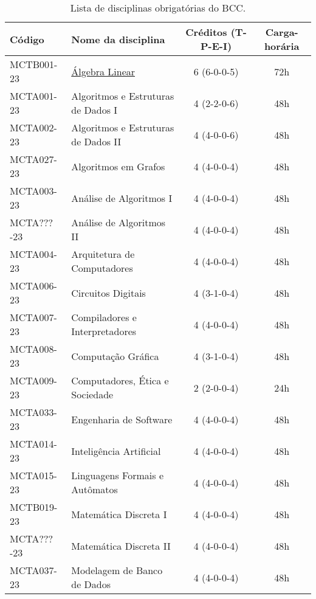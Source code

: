 \begin{table}[!h]
    \caption{Lista de disciplinas obrigatórias do BCC.}
    \label{tab:disciplinas_obrigatorias_bcc}

    \centering
    \begin{tabular}{|l|p{}|c|c|}
        \hline
        \textbf{Código} & \textbf{Nome da disciplina} & \textbf{Créditos (T-P-E-I)} & \textbf{Carga-horária}\\
        \hline\hline
        MCTB001-23 & \hyperref[disc:alge_lin]{Álgebra Linear} & 6 (6-0-0-5) & 72h \\
        \hline
        MCTA001-23 & Algoritmos e Estruturas de Dados I & 4 (2-2-0-6) & 48h \\
        \hline
        MCTA002-23 & Algoritmos e Estruturas de Dados II & 4 (4-0-0-6) & 48h \\
        \hline
        MCTA027-23 & Algoritmos em Grafos & 4 (4-0-0-4) & 48h\\
        \hline
        MCTA003-23 & Análise de Algoritmos I & 4 (4-0-0-4) & 48h \\
        \hline
        MCTA???-23 & Análise de Algoritmos II & 4 (4-0-0-4) & 48h \\
        \hline
        MCTA004-23 & Arquitetura de Computadores & 4 (4-0-0-4) & 48h \\
        \hline
        MCTA006-23 & Circuitos Digitais & 4 (3-1-0-4) & 48h \\
        \hline
        MCTA007-23 & Compiladores e Interpretadores & 4 (4-0-0-4) & 48h \\
        \hline
        MCTA008-23 & Computação Gráfica & 4 (3-1-0-4) & 48h  \\
        \hline
        MCTA009-23 & Computadores, Ética e Sociedade & 2 (2-0-0-4) & 24h \\
        \hline
        MCTA033-23 & Engenharia de Software & 4 (4-0-0-4) & 48h \\
        \hline
        MCTA014-23 & Inteligência Artificial & 4 (4-0-0-4) & 48h \\
        \hline
        MCTA015-23 & Linguagens Formais e Autômatos & 4 (4-0-0-4) & 48h \\
        \hline
        MCTB019-23 & Matemática Discreta I & 4 (4-0-0-4) & 48h \\
        \hline
        MCTA???-23 & Matemática Discreta II & 4 (4-0-0-4) & 48h \\
        \hline
        MCTA037-23 & Modelagem de Banco de Dados & 4 (4-0-0-4) & 48h \\

\end{tabular}
\end{table}
